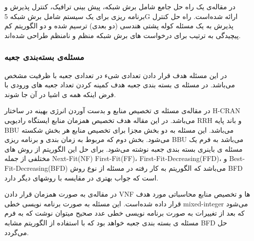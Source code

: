 در مقاله‌ی
\cite{sciancalepore2017mobile}
یک راه حل جامع شامل برش شبکه، پیش بینی ترافیک، کنترل پذیرش و برنامه ریزی برای یک سیستم شامل برش شبکه 5G ارائه شده‌است.
راه حل کنترل پذیرش به یک مسئله کوله پشتی هندسی (دو بعدی) ترسیم شده و دو الگوریتم کم پیچیدگی به ترتیب برای درخواست های برش شبکه منظم و نامنظم طراحی شده‌اند. 
\subsubsection{مسئله‌ی بسته‌بندی جعبه}
 در این مسئله هدف قرار دادن تعدادی شیء در تعدادی جعبه با ظرفیت مشخص می‌باشد.
در مسئله ی بسته بندی جعبه 
هدف کمینه کردن تعداد جعبه های ورودی با فرض اینکه همه ی اشیا در آن جا شوند.

در مقاله‌ی
\citep{wang2017joint}
مسئله ی تخصیص منابع و بدست آوردن انرژی بهینه در ساختار
H-CRAN
می‌باشد.
در این مقاله هدف تخصیص همزمان منابع ایستگاه رادیویی RRH و باند پایه BBU می‌باشد.
این مسئله به دو بخش مجزا برای تخصیص منابع هر بخش شکسته می‌شود.
بخش دوم که مربوط به زمان بندی و برنامه ریزی BBU می‌باشد به فرم یک مسئله ی باینری بسته بندی جعبه نوشته می‌شود.
برای حل این الگوریتم از روش های مختلفی از جمله
Next-Fit(NF)
First-Fit(FF)،
First-Fit-Decreasing(FFD)،
و
‌Best-Fit-Decreasing(BFD)
می‌باشد که الگوریتم به کار رفته در مسئله از نوع روش
BFD 
 است که جواب بهتری در مقایسه با روشهای دیگر دارد.  
 
در مقاله‌ی
\cite{de2020optimal}
به صورت همزمان قرار دادن VNF ها و تخصیص منابع محاسباتی مورد هدف قرار داده شده‌است.
این مسئله به صورت
برنامه نویسی خطی 
mixed-integer
می‌شود که بعد از تغییرات به صورت برنامه نویسی خطی عدد صحیح میتوان نوشت که به فرم مسئله ی بسته بندی جعبه خواهد بود که با استفاده از الگوریتم مشابه
BFD حل می‌گردد.
